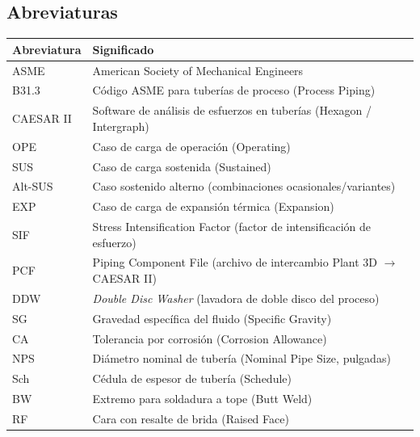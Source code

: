 \vspace{1cm}

\subsection*{Abreviaturas}

\noindent\begin{tabularx}{\textwidth}{@{}l>{\raggedright\arraybackslash}X@{}}
	\toprule
	\textbf{Abreviatura} & \textbf{Significado} \\
	\midrule
	ASME & American Society of Mechanical Engineers \\
	B31.3 & C\'{o}digo ASME para tuber\'{i}as de proceso (Process Piping) \\
	CAESAR II & Software de an\'{a}lisis de esfuerzos en tuber\'{i}as (Hexagon / Intergraph) \\
	OPE & Caso de carga de operaci\'{o}n (Operating) \\
	SUS & Caso de carga sostenida (Sustained) \\
	Alt-SUS & Caso sostenido alterno (combinaciones ocasionales/variantes) \\
	EXP & Caso de carga de expansi\'{o}n t\'{e}rmica (Expansion) \\
	SIF & Stress Intensification Factor (factor de intensificaci\'{o}n de esfuerzo) \\
	PCF & Piping Component File (archivo de intercambio Plant 3D $\rightarrow$ CAESAR II) \\
	DDW & \textit{Double Disc Washer} (lavadora de doble disco del proceso) \\
	SG & Gravedad espec\'{i}fica del fluido (Specific Gravity) \\
	CA & Tolerancia por corrosi\'{o}n (Corrosion Allowance) \\
	NPS & Di\'{a}metro nominal de tuber\'{i}a (Nominal Pipe Size, pulgadas) \\
	Sch & C\'{e}dula de espesor de tuber\'{i}a (Schedule) \\
	BW & Extremo para soldadura a tope (Butt Weld) \\
	RF & Cara con resalte de brida (Raised Face) \\
	\bottomrule
\end{tabularx}

\newpage
